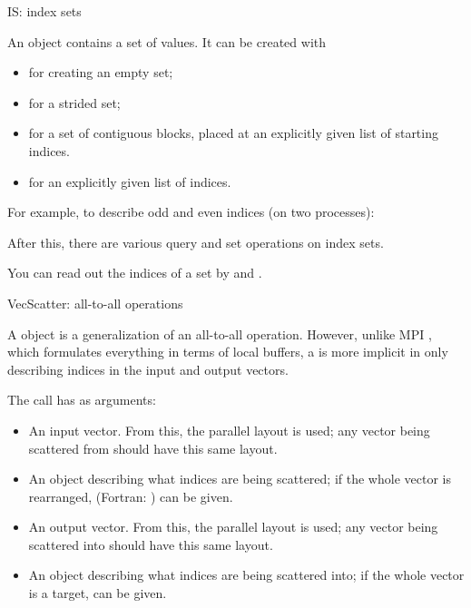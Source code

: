  {IS: index sets}
\label{sec:petsc-is}

An  object contains a set of  values.
It can be created with
\begin{itemize}
\item {} for creating an empty set;
\item {} for a strided set;
\item {} for a set of contiguous blocks,
  placed at an explicitly given list of starting indices.
\item {} for an explicitly given list of indices.
\end{itemize}

For example, to describe odd and even indices (on two processes):
%

After this, there are various query and set operations on index sets.

You can read out the indices of a set by 
and .

 {VecScatter: all-to-all operations}
\label{sec:petsc-vs}

A  object is a generalization of an
all-to-all operation. However, unlike MPI ,
which formulates everything in terms of local buffers, a
 is more implicit in only describing indices in
the input and output vectors.

The  call has as arguments:
\begin{itemize}
\item An input vector. From this, the parallel layout is used; any
  vector being scattered from should have this same layout.
\item An  object describing what indices are being
  scattered; if the whole vector is rearranged, 
  (Fortran: ) can be given.
\item An output vector. From this, the parallel layout is used; any
  vector being scattered into should have this same layout.
\item An  object describing what indices are being
  scattered into; if the whole vector is a target,  can
  be given.
\end{itemize}

